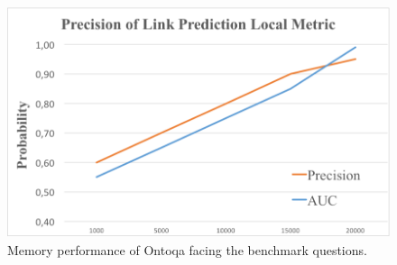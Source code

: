 \begin{figure}[tp]
	\centering
	\includegraphics{./fig/evaluation-memory}
	\caption{Memory performance of Ontoqa facing the benchmark questions.}
	\label{fig:evaluation-memory}
\end{figure}